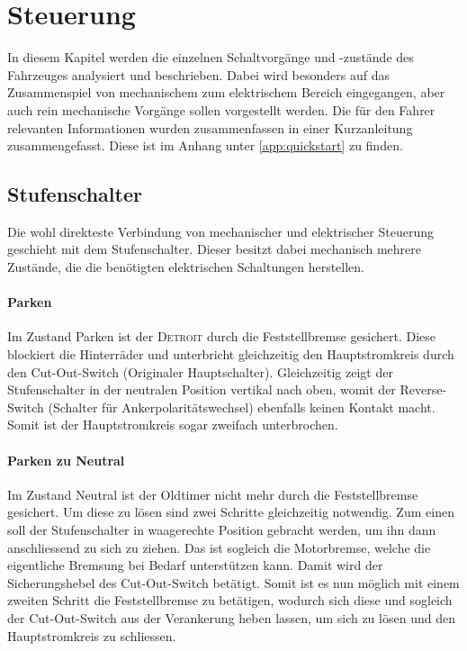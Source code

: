 \section{Steuerung}
In diesem Kapitel werden die einzelnen Schaltvorgänge und -zustände des Fahrzeuges analysiert und beschrieben. Dabei wird besonders auf das Zusammenspiel von mechanischem zum elektrischem Bereich eingegangen, aber auch rein mechanische Vorgänge sollen vorgestellt werden. Die für den Fahrer relevanten Informationen wurden zusammenfassen in einer Kurzanleitung zusammengefasst. Diese ist im Anhang unter \ref{app:quickstart} zu finden.

\subsection{Stufenschalter}
Die wohl direkteste Verbindung von mechanischer und elektrischer Steuerung geschieht mit dem Stufenschalter. Dieser besitzt dabei mechanisch mehrere Zustände, die die benötigten elektrischen Schaltungen herstellen.

\paragraph{Parken}
Im Zustand Parken ist der \textsc{Detroit} durch die Feststellbremse gesichert. Diese blockiert die Hinterräder und unterbricht gleichzeitig den Hauptstromkreis durch den Cut-Out-Switch (Originaler Hauptschalter). Gleichzeitig zeigt der Stufenschalter in der neutralen Position vertikal nach oben, womit der Reverse-Switch (Schalter für Ankerpolaritätswechsel) ebenfalls keinen Kontakt macht. Somit ist der Hauptstromkreis sogar zweifach unterbrochen.

\paragraph{Parken zu Neutral}
Im Zustand Neutral ist der Oldtimer nicht mehr durch die Feststellbremse gesichert. Um diese zu lösen sind zwei Schritte gleichzeitig notwendig. Zum einen soll der Stufenschalter in waagerechte Position gebracht werden, um ihn dann anschliessend zu sich zu ziehen. Das ist sogleich die Motorbremse, welche die eigentliche Bremsung bei Bedarf unterstützen kann. Damit wird der Sicherungshebel des Cut-Out-Switch betätigt. Somit ist es nun möglich mit einem zweiten Schritt die Feststellbremse zu betätigen, wodurch sich diese und sogleich der Cut-Out-Switch aus der Verankerung heben lassen, um sich zu lösen und den Hauptstromkreis zu schliessen.

